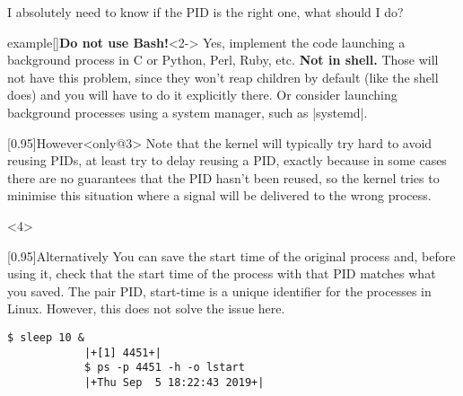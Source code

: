 \begin{frame}[fragile]{I absolutely need to know if the PID is the right one, what should I do?}
    \vspace{-3mm}
    \large
    \begin{varblock}{example}[\textwidth]{\textbf{Do not use Bash!}}<2->
        Yes, implement the code launching a background process in C or Python, Perl, Ruby, etc.
        \textbf{Not in shell.}
        Those will not have this problem, since they won't reap children by default (like the shell does) and you will have to do it explicitly there.
        Or consider launching background processes using a system manager, such as \bash|systemd|.
    \end{varblock}
    \small
    \begin{varblock}{}[0.95\textwidth]{However}<only@3>
        Note that the kernel will typically try hard to avoid reusing PIDs, at least try to delay reusing a PID, exactly because in some cases there are no guarantees that the PID hasn't been reused, so the kernel tries to minimise this situation where a signal will be delivered to the wrong process.
    \end{varblock}
    \vspace{-2pt}
    \begin{onlyenv}<4>
        \begin{varblock}{}[0.95\textwidth]{Alternatively}
            You can save the start time of the original process and, before using it, check that the start time of the process with that PID matches what you saved.
            The pair PID, start-time is a unique identifier for the processes in Linux.
            However, this does not solve the issue here.
        \end{varblock}
        \begin{lstlisting}[style=MyBash, numbers=none]
            $ sleep 10 &
            |+[1] 4451+|
            $ ps -p 4451 -h -o lstart
            |+Thu Sep  5 18:22:43 2019+|
        \end{lstlisting}
    \end{onlyenv}
\end{frame}

